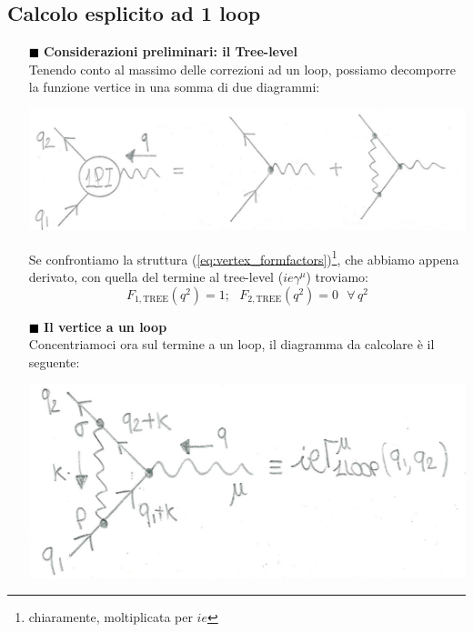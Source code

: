 \documentclass[../main.tex]{subfiles}
\begin{document}
\subsection{Calcolo esplicito ad 1 loop}
\begin{itemize}
    \item [\textcolor{Black}{$\blacksquare$}]\textbf{Considerazioni preliminari: il Tree-level}\\
        Tenendo conto al massimo delle correzioni ad un loop, possiamo decomporre la funzione vertice in una somma di due diagrammi:
        
        \includegraphics[]{images_ch2/vertex_decomposition.jpg}

        Se confrontiamo la struttura (\ref{eq:vertex_formfactors})\footnote{chiaramente, moltiplicata per $ie$}, che abbiamo appena derivato, con quella del termine al tree-level ($ie\gamma^\mu$) troviamo:
        \begin{equation}
            F_{1, \text{TREE}}(q^2) = 1; ~~~ F_{2, \text{TREE}}(q^2) = 0 ~~~\forall\,q^2
            \label{eq:formfactors_treelevel}
        \end{equation}
    \item [\textcolor{Black}{$\blacksquare$}]\textbf{Il vertice a un loop}\\
    Concentriamoci ora sul termine a un loop, il diagramma da calcolare è il seguente:
    
    \includegraphics[]{images_ch2/vertex_oneloop.JPG}


\end{itemize}
\end{document}
